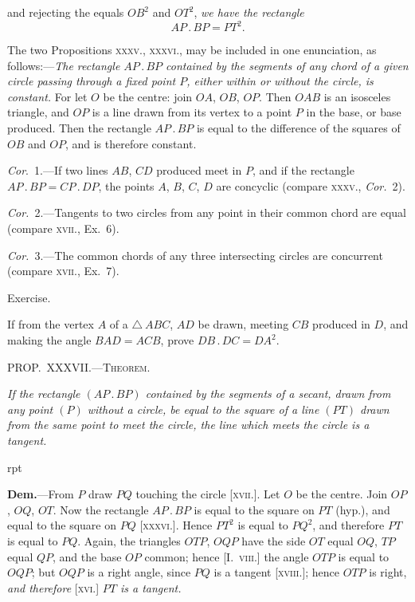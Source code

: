 \documentclass[oneside]{book}
\newcommand\mypropl[2]{
\bigskip\Needspace*{4\baselineskip}\begin{center}\textsc{#1}\end{center}
\hspace{\parindent}\emph{#2}\par\medskip
}
\newcommand\exhead[1]{
\Needspace*{5\baselineskip}\begin{center}
\textsf{#1}
\end{center}
}
\newcommand\imgflow[3]{
\setcounter{wrapwidth}{#1}
\begin{wrapfigure}[#2]{r}{\value{wrapwidth}pt}
\begin{center}
\vspace{-0.3in}
\end{center}
\end{wrapfigure}
}
\begin{document}
\noindent and rejecting the equals $OB^2$ and $OT^2$, \emph{we have the
rectangle}
\[
AP\,.\,BP = PT^2.
\]

\begin{footnotesize}
The two Propositions \textsc{xxxv., xxxvi.}, may be included in one
enunciation, as follows:---\emph{The rectangle $AP\,.\,BP$ contained by the
segments of any chord of a given circle passing through a fixed point
$P$, either within or without the circle, is constant.} For let $O$ be
the centre: join $OA$, $OB$, $OP$. Then $OAB$ is an isosceles triangle,
and $OP$ is a line drawn from its vertex to a point $P$ in the base,
or base produced. Then the rectangle $AP\,.\,BP$ is equal to the
difference of the squares of $OB$ and $OP$, and is therefore constant.
\par\end{footnotesize}

\emph{Cor}.~1.---If two lines $AB$, $CD$ produced meet in $P$,
and if the rectangle $AP\,.\,BP = CP\,.\,DP$, the points
$A$, $B$, $C$, $D$ are concyclic\label{concylic3} (compare \textsc{xxxv}., \emph{Cor.}~2).

\emph{Cor.}~2.---Tangents to two circles from any point in
their common chord are equal (compare \textsc{xvii}., Ex.~6).

\emph{Cor.}~3.---The common chords of any three intersecting
circles are concurrent (compare \textsc{xvii.}, Ex.~7).

\exhead{Exercise.}

\begin{footnotesize}
If from the vertex $A$ of a $\triangle\ ABC$, $AD$ be drawn, meeting
$CB$ produced in $D$, and making the angle $BAD = ACB$, prove
$DB\,.\,DC = DA^2$.
\par\end{footnotesize}

\mypropl{PROP\@.~XXXVII\@.---Theorem.}{If the rectangle $(AP\,.\,BP)$ contained by the segments of
a secant, drawn from any point $(P)$ without a circle, be
equal to the square of a line $(PT)$ drawn from the same
point to meet the circle, the line which meets the circle is
a tangent.}

\imgflow{175}{10}{f150}

\textbf{Dem.}---From $P$ draw $PQ$ touching the circle [\textsc{xvii.}].
Let $O$ be the centre.
Join $OP$, $OQ$, $OT$.
Now the rectangle
$AP\,.\,BP$ is equal to the
square on $PT$ (hyp.),
and equal to the square
on $PQ$ [\textsc{xxxvi.}]. Hence
$PT^2$ is equal to $PQ^2$,
and therefore $PT$ is
equal to $PQ$. Again,
the triangles $OTP$, $OQP$ have the side $OT$ equal $OQ$,
$TP$ equal $QP$, and the base $OP$ common; hence [I.~\textsc{viii.}]
the angle $OTP$ is equal to $OQP$; but $OQP$ is a right
angle, since $PQ$ is a tangent [\textsc{xviii.}]; hence $OTP$ is
right, \emph{and therefore} [\textsc{xvi.}] \emph{$PT$ is a tangent.}
\end{document}
